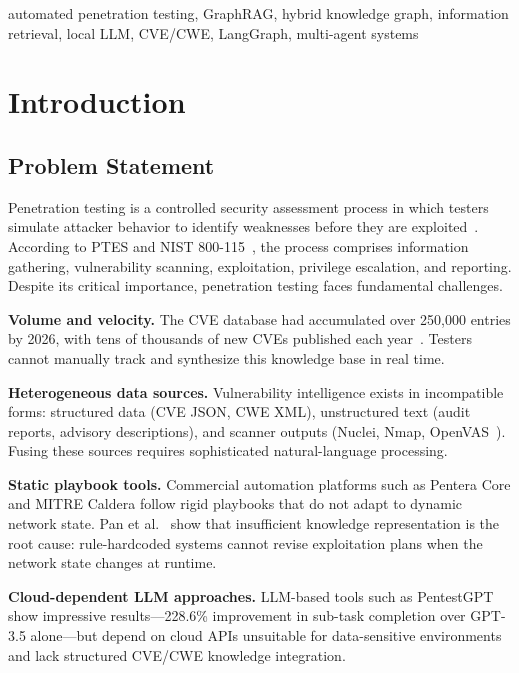 \documentclass[conference]{IEEEtran}
\begin{document}
\begin{IEEEkeywords}
automated penetration testing, GraphRAG, hybrid knowledge graph, information
retrieval, local LLM, CVE/CWE, LangGraph, multi-agent systems
\end{IEEEkeywords}

\section{Introduction}

\subsection{Problem Statement}

Penetration testing is a controlled security assessment process in which testers
simulate attacker behavior to identify weaknesses before they are
exploited~\cite{weidman2014pentest}.
According to PTES and NIST 800-115~\cite{nist800115}, the process comprises
information gathering, vulnerability scanning, exploitation, privilege escalation,
and reporting.
Despite its critical importance, penetration testing faces fundamental challenges.

\textbf{Volume and velocity.}
The CVE database had accumulated over 250,000 entries by 2026, with tens of
thousands of new CVEs published each year~\cite{mitrecve}.
Testers cannot manually track and synthesize this knowledge base in real time.

\textbf{Heterogeneous data sources.}
Vulnerability intelligence exists in incompatible forms: structured data
(CVE JSON, CWE XML), unstructured text (audit reports, advisory descriptions),
and scanner outputs (Nuclei, Nmap, OpenVAS~\cite{zhang2026pentest}).
Fusing these sources requires sophisticated natural-language processing.

\textbf{Static playbook tools.}
Commercial automation platforms such as Pentera Core and MITRE Caldera follow
rigid playbooks that do not adapt to dynamic network state.
Pan et al.~\cite{pan2025cskg} show that insufficient knowledge representation
is the root cause: rule-hardcoded systems cannot revise exploitation plans when
the network state changes at runtime.

\textbf{Cloud-dependent LLM approaches.}
LLM-based tools such as PentestGPT~\cite{deng2024pentestgpt} show impressive
results—228.6\% improvement in sub-task completion over GPT-3.5 alone—but
depend on cloud APIs unsuitable for data-sensitive environments and lack
structured CVE/CWE knowledge integration.
\end{document}
